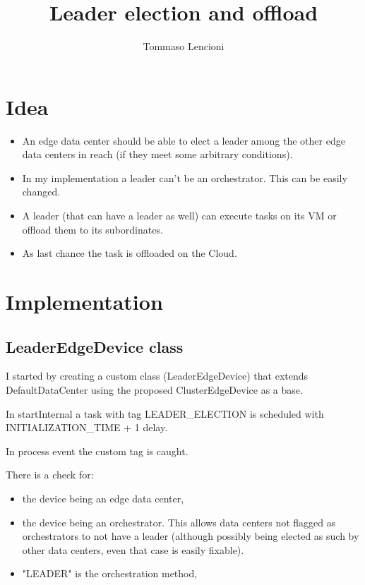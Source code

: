 \documentclass[12pt, a4paper]{report} %
\title{Leader election and offload}
\author{Tommaso Lencioni}
\begin{document}
\section*{Idea}
\begin{itemize}
	\item An edge data center should be able to elect a leader among the other edge data centers in reach (if they meet some arbitrary conditions).
	\item In my implementation a leader can't be an orchestrator. This can be easily changed.
	\item A leader (that can have a leader as well) can execute tasks on its VM or offload them to its subordinates.
	\item As last chance the task is offloaded on the Cloud.
\end{itemize}

\section*{Implementation}
\subsection*{LeaderEdgeDevice class}
I started by creating a custom class (LeaderEdgeDevice) that extends DefaultDataCenter using the proposed ClusterEdgeDevice as a base.

In startInternal a task with tag LEADER\_ELECTION is scheduled with INITIALIZATION\_TIME + 1 delay.

In process event the custom tag is caught.

There is a check for:
 	\begin{itemize}
 		\item the device being an edge data center,
 		\item the device being an orchestrator. This allows data centers not flagged as orchestrators to not have a leader (although possibly being elected as such by other data centers, even that case is easily fixable).
 		\item "LEADER" is the orchestration method,
  	\end{itemize}
\end{document}
